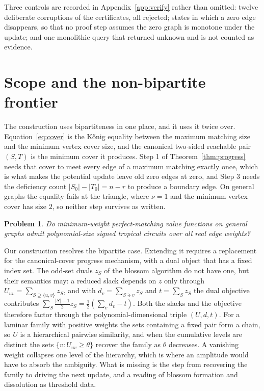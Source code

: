\documentclass[11pt]{article}
\newtheorem{problem}[theorem]{Problem}
\begin{document}
Three controls are recorded in Appendix~\ref{app:verify} rather than omitted:
twelve deliberate corruptions of the certificates, all rejected; states in which
a zero edge disappears, so that no proof step assumes the zero graph is monotone
under the update; and one monolithic query that returned unknown and is not
counted as evidence.

\section{Scope and the non-bipartite frontier}
\label{sec:frontier}

The construction uses bipartiteness in one place, and it uses it twice over.
Equation~\eqref{eq:cover} is the K\H{o}nig equality between the maximum matching
size and the minimum vertex cover size, and the canonical two-sided reachable
pair $(S,T)$ is the minimum cover it produces.  Step 1 of
Theorem~\ref{thm:progress} needs that cover to meet every edge of a maximum
matching exactly once, which is what makes the potential update leave old zero
edges at zero, and Step 3 needs the deficiency count $|S_0|-|T_0|=n-r$ to produce
a boundary edge.  On general graphs the equality fails at the triangle, where
$\nu=1$ and the minimum vertex cover has size $2$, so neither step survives as
written.

\begin{problem}
Do minimum-weight perfect-matching value functions on general graphs admit
polynomial-size signed tropical circuits over all real edge weights?
\end{problem}

Our construction resolves the bipartite case.  Extending it requires a
replacement for the canonical-cover progress mechanism, with a dual object that
has a fixed index set.  The odd-set duals $z_S$ of the blossom algorithm do not
have one, but their semantics may: a reduced slack depends on $z$ only through
$U_{uv}=\sum_{S\supseteq\{u,v\}}z_S$, and with $d_v=\sum_{S\ni v}z_S$ and
$t=\sum_Sz_S$ the dual objective contributes
$\sum_S\tfrac{|S|-1}2z_S=\tfrac12(\sum_vd_v-t)$.  Both the slacks and the
objective therefore factor through the polynomial-dimensional triple
$(U,d,t)$.  For a laminar family with positive weights the sets containing a
fixed pair form a chain, so $U$ is a hierarchical pairwise similarity, and when
the cumulative levels are distinct the sets $\{v:U_{uv}\ge\theta\}$ recover the
family as $\theta$ decreases.  A vanishing weight collapses one level of the
hierarchy, which is where an amplitude would have to absorb the ambiguity.  What
is missing is the step from recovering the family to driving the next update,
and a reading of blossom formation and dissolution as threshold data.
\end{document}
